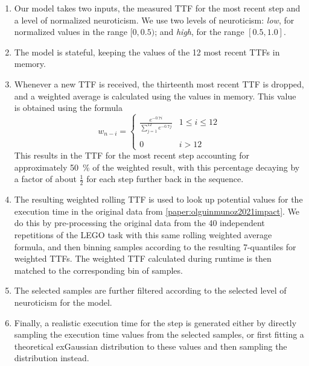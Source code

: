 \begin{enumerate}
    \item Our model takes two inputs, the measured \gls{TTF} for the most recent step and a level of normalized neuroticism.
    We use two levels of neuroticism: \emph{low}, for normalized values in the range \ensuremath{[0, 0.5)}; and \emph{high}, for the range \ensuremath{[0.5, 1.0]}.
    \item The model is stateful, keeping the values of the \num{12} most recent \glspl{TTF} in memory.
    \item Whenever a new \gls{TTF} is received, the thirteenth most recent \gls{TTF} is dropped, and a weighted average is calculated using the values in memory.
    This value is obtained using the formula
    \begin{equation}
        \label{eq:modelweights}
        w_{n - i} =
        \left\{ \begin{array}{ll}
                    \frac{e^{-0.7 i}}{\sum\limits^{12}_{j=1} e^{-0.7 j}} & 1 \leq i \leq 12 \\
                    &                  \\
                    0                                                    & i > 12
        \end{array} \right.
    \end{equation}
    This results in the \gls{TTF} for the most recent step accounting for approximately \SI{50}{\percent} of the weighted result, with this percentage decaying by a factor of about \ensuremath{\frac{1}{2}} for each step further back in the sequence.

    \item The resulting weighted rolling \gls{TTF} is used to look up potential values for the execution time in the original data from \cref{paper:olguinmunoz2021impact}.
    We do this by pre-processing the original data from the \num{40} independent repetitions of the LEGO task with this same rolling weighted average formula, and then binning samples according to the resulting \num{7}-quantiles for weighted \glspl{TTF}.
    The weighted \gls{TTF} calculated during runtime is then matched to the corresponding bin of samples.

    \item The selected samples are further filtered according to the selected level of neuroticism for the model.
    \item Finally, a realistic execution time for the step is generated either by directly sampling the execution time values from the selected samples, or first fitting a theoretical \gls{exGaussian} distribution to these values and then sampling the distribution instead.
\end{enumerate}

